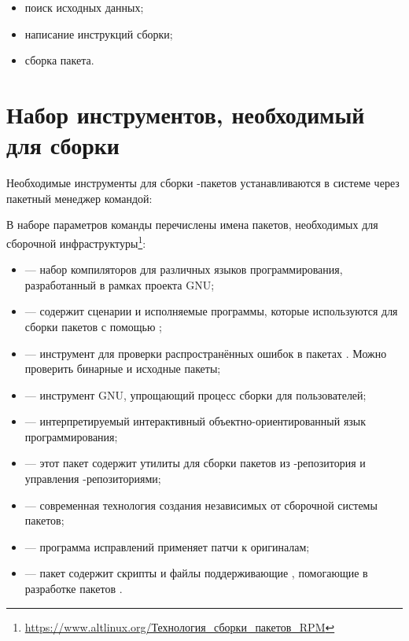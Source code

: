 \begin{itemize}
	\item поиск исходных данных;
	\item написание инструкций сборки;
	\item сборка пакета.
\end{itemize}

\section{Набор инструментов, необходимый для сборки}

Необходимые инструменты для сборки -пакетов устанавливаются 
в системе через пакетный менеджер  командой:\\


В наборе параметров команды  перечислены имена пакетов, необходимых для сборочной 
инфраструктуры\footnote{\href{https://www.altlinux.org/\%D0\%A2\%D0\%B5\%D1\%85\%D0\%BD\%D0\%BE\%D0\%BB\%D0\%BE\%D0\%B3\%D0\%B8\%D1\%8F_\%D1\%81\%D0\%B1\%D0\%BE\%D1\%80\%D0\%BA\%D0\%B8_\%D0\%BF\%D0\%B0\%D0\%BA\%D0\%B5\%D1\%82\%D0\%BE\%D0\%B2_RPM}{https://www.altlinux.org/Технология\_сборки\_пакетов\_RPM}}:

\begin{itemize}
	\item {} --- набор компиляторов для различных языков программирования, разработанный в рамках проекта GNU;
	\item {} --- содержит сценарии и исполняемые программы, которые используются для сборки пакетов с помощью ;
	\item {} --- инструмент для проверки распространённых ошибок в пакетах . Можно проверить бинарные и исходные пакеты;
	\item {} --- инструмент GNU, упрощающий процесс сборки для пользователей;
	\item {} --- интерпретируемый интерактивный объектно-ориентированный язык программирования;
	\item {} --- этот пакет содержит утилиты для сборки пакетов  из -репозитория и управления -репозиториями;
	\item {} --- современная технология создания независимых от сборочной системы пакетов;
	\item {} --- программа исправлений применяет патчи к оригиналам;
	\item {} --- пакет содержит скрипты и файлы поддерживающие , помогающие в разработке пакетов .
\end{itemize}

